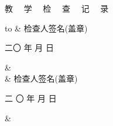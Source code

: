 \documentclass[a4paper,12pt]{article}
\numberwithin{table}{section}
\numberwithin{figure}{section}
\begin{document}
\newpage
\pagestyle{empty}
\begin{center}
	\huge \hei 教 ~~学 ~~检 ~~查 ~~记~~ 录
	
	\song\normalsize 
	\begin{tabu} to \textwidth {|X[1,c,m]|X[10,r,m]|N}
		\hline
	  &\vspace{7cm}  检查人签名(盖章) 
	\hspace{4cm} \par  二〇 \underline{\hspace{2em}}   
	年\underline{\hspace{1em}}   月 \underline{\hspace{1em}}  日 
	\hspace{1cm}  \par &\\ [8cm] \hline
	 & \vspace{7cm}  检查人签名(盖章) 
	\hspace{4cm} \par  二 〇  \underline{\hspace{2em}} 年  
	\underline{\hspace{1em}} 月 \underline{\hspace{1em}}  日 \hspace{1cm} 
	\par & \\[8cm] \hline	
	\end{tabu}
\end{center}




%
%
%
%
%
%
%
\end{document}
